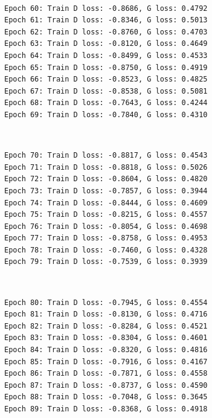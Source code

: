 \documentclass[11pt]{article}
\begin{document}
    \begin{center}
    \end{center}
    { \hspace*{\fill} \\}
    
    \begin{Verbatim}[commandchars=\\\{\}]
Epoch 60: Train D loss: -0.8686, G loss: 0.4792
Epoch 61: Train D loss: -0.8346, G loss: 0.5013
Epoch 62: Train D loss: -0.8760, G loss: 0.4703
Epoch 63: Train D loss: -0.8120, G loss: 0.4649
Epoch 64: Train D loss: -0.8499, G loss: 0.4533
Epoch 65: Train D loss: -0.8750, G loss: 0.4919
Epoch 66: Train D loss: -0.8523, G loss: 0.4825
Epoch 67: Train D loss: -0.8538, G loss: 0.5081
Epoch 68: Train D loss: -0.7643, G loss: 0.4244
Epoch 69: Train D loss: -0.7840, G loss: 0.4310

    \end{Verbatim}

    \begin{center}
    \end{center}
    { \hspace*{\fill} \\}
    
    \begin{Verbatim}[commandchars=\\\{\}]
Epoch 70: Train D loss: -0.8817, G loss: 0.4543
Epoch 71: Train D loss: -0.8818, G loss: 0.5026
Epoch 72: Train D loss: -0.8604, G loss: 0.4820
Epoch 73: Train D loss: -0.7857, G loss: 0.3944
Epoch 74: Train D loss: -0.8444, G loss: 0.4609
Epoch 75: Train D loss: -0.8215, G loss: 0.4557
Epoch 76: Train D loss: -0.8054, G loss: 0.4698
Epoch 77: Train D loss: -0.8758, G loss: 0.4953
Epoch 78: Train D loss: -0.7460, G loss: 0.4328
Epoch 79: Train D loss: -0.7539, G loss: 0.3939

    \end{Verbatim}

    \begin{center}
    \end{center}
    { \hspace*{\fill} \\}
    
    \begin{Verbatim}[commandchars=\\\{\}]
Epoch 80: Train D loss: -0.7945, G loss: 0.4554
Epoch 81: Train D loss: -0.8130, G loss: 0.4716
Epoch 82: Train D loss: -0.8284, G loss: 0.4521
Epoch 83: Train D loss: -0.8304, G loss: 0.4601
Epoch 84: Train D loss: -0.8320, G loss: 0.4816
Epoch 85: Train D loss: -0.7916, G loss: 0.4167
Epoch 86: Train D loss: -0.7871, G loss: 0.4558
Epoch 87: Train D loss: -0.8737, G loss: 0.4590
Epoch 88: Train D loss: -0.7048, G loss: 0.3645
Epoch 89: Train D loss: -0.8368, G loss: 0.4918

    \end{Verbatim}
\end{document}
